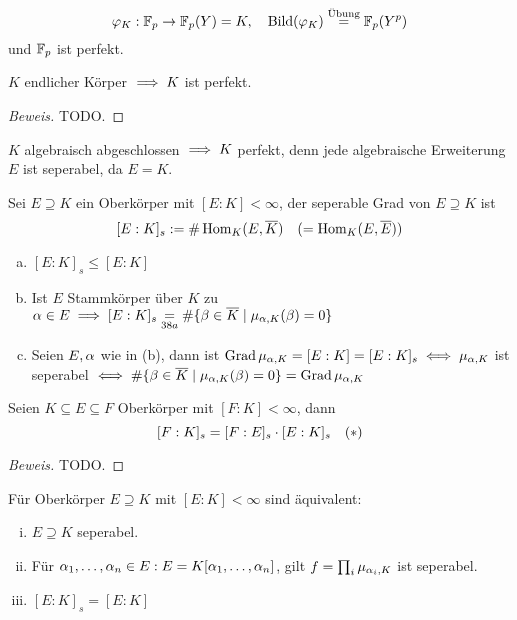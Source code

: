 \documentclass[a4paper]{report}
\begin{document}
\begin{bsp*}
  \[\varphi_{K} : \mathbb{F}_p \to \mathbb{F}_p(Y) = K,\quad \operatorname{Bild}(\varphi_{K}) \overset{\text{Übung}} = \mathbb{F}_p(Y^{p})\]
  und $\mathbb{F}_p$ ist perfekt.
\end{bsp*}

\begin{kor}
$K$ endlicher Körper $\implies K$ ist perfekt.
\end{kor}
\begin{proof}[Beweis]
TODO.
\end{proof}
\begin{bsp}
$K$ algebraisch abgeschlossen $\implies K$ perfekt, denn jede algebraische Erweiterung $E$ ist seperabel, da $E = K$.
\end{bsp}

\begin{defi}Sei $E \supseteq K$ ein Oberkörper mit $[E:K] < \infty$, der seperable Grad von $E \supseteq K$ ist \[[E:K]_{s}:= \#\operatorname{Hom}_{K}(E, \overline K)\quad (=\operatorname{Hom}_{K}(E, \overline E))\]
\end{defi}

\begin{facts}
\begin{enumerate}[(a)]
  \item $[E:K]_{s} \le [E:K]$
  \item Ist $E$ Stammkörper über $K$ zu $\alpha \in E \implies [E:K]_{s} \underset{38a}= \#\{\beta \in \overline K \mid \mu_{\alpha, K}(\beta) = 0\}$
  \item Seien $E, \alpha$ wie in (b), dann ist $\operatorname{Grad} \mu_{\alpha, K} = [E:K] = [E:K]_{s} \iff \mu_{\alpha, K}$ ist seperabel $\iff \#\{\beta \in \overline K \mid \mu_{\alpha, K}(\beta) = 0\} = \operatorname{Grad} \mu_{\alpha, K}$
\end{enumerate}
\end{facts}

\begin{lemm}
  Seien $K \subseteq E \subseteq F$ Oberkörper mit $[F:K] < \infty$, dann
  \[[F:K]_{s} = [F:E]_{s} \cdot [E:K]_{s} \quad (*)\]
  \begin{proof}[Beweis]
TODO.
  \end{proof}
\end{lemm}

\begin{satz}
  Für Oberkörper $E \supseteq K$ mit $[E:K] < \infty$ sind äquivalent:
  \begin{enumerate}[(i)]
    \item $E \supseteq K$ seperabel.
    \item Für $\alpha_{1}, \ldots, \alpha_{n} \in E : E = K[\alpha_1, \ldots, \alpha_{n}]$, gilt $f = \prod_{i}\mu_{\alpha_{i}, K}$ ist seperabel.
    \item $[E:K]_{s} = [E:K]$
  \end{enumerate}

\end{satz}
\end{document}
